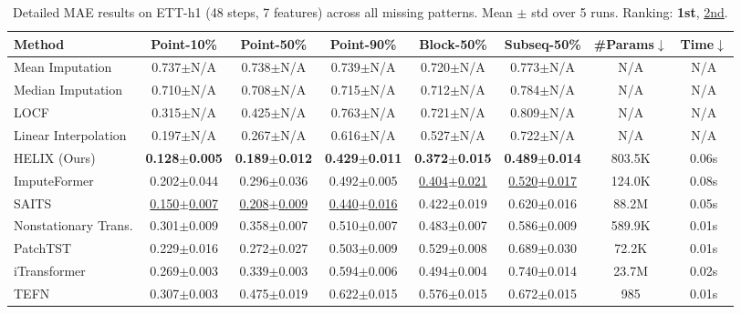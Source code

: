 \begin{table}[t]
    \caption{Detailed MAE results on ETT-h1 (48 steps, 7 features) across all missing patterns. Mean $\pm$ std over 5 runs. Ranking: \textbf{1st}, \underline{2nd}.}
    \label{tab:detailed_results}
    \centering
    \begin{small}
    \begin{tabular}{l|ccccc|cc}
        \toprule
        \textbf{Method} & \textbf{Point-10\%} & \textbf{Point-50\%} & \textbf{Point-90\%} & \textbf{Block-50\%} & \textbf{Subseq-50\%} & \textbf{\#Params}$\downarrow$ & \textbf{Time}$\downarrow$ \\
        \midrule
        Mean Imputation & 0.737$\pm$N/A & 0.738$\pm$N/A & 0.739$\pm$N/A & 0.720$\pm$N/A & 0.773$\pm$N/A & N/A & N/A \\
        Median Imputation & 0.710$\pm$N/A & 0.708$\pm$N/A & 0.715$\pm$N/A & 0.712$\pm$N/A & 0.784$\pm$N/A & N/A & N/A \\
        LOCF & 0.315$\pm$N/A & 0.425$\pm$N/A & 0.763$\pm$N/A & 0.721$\pm$N/A & 0.809$\pm$N/A & N/A & N/A \\
        Linear Interpolation & 0.197$\pm$N/A & 0.267$\pm$N/A & 0.616$\pm$N/A & 0.527$\pm$N/A & 0.722$\pm$N/A & N/A & N/A \\
        \midrule
        HELIX (Ours) & \textbf{0.128$\pm$0.005} & \textbf{0.189$\pm$0.012} & \textbf{0.429$\pm$0.011} & \textbf{0.372$\pm$0.015} & \textbf{0.489$\pm$0.014} & 803.5K & 0.06s \\
        ImputeFormer & 0.202$\pm$0.044 & 0.296$\pm$0.036 & 0.492$\pm$0.005 & \underline{0.404$\pm$0.021} & \underline{0.520$\pm$0.017} & 124.0K & 0.08s \\
        SAITS & \underline{0.150$\pm$0.007} & \underline{0.208$\pm$0.009} & \underline{0.440$\pm$0.016} & 0.422$\pm$0.019 & 0.620$\pm$0.016 & 88.2M & 0.05s \\
        Nonstationary Trans. & 0.301$\pm$0.009 & 0.358$\pm$0.007 & 0.510$\pm$0.007 & 0.483$\pm$0.007 & 0.586$\pm$0.009 & 589.9K & 0.01s \\
        PatchTST & 0.229$\pm$0.016 & 0.272$\pm$0.027 & 0.503$\pm$0.009 & 0.529$\pm$0.008 & 0.689$\pm$0.030 & 72.2K & 0.01s \\
        iTransformer & 0.269$\pm$0.003 & 0.339$\pm$0.003 & 0.594$\pm$0.006 & 0.494$\pm$0.004 & 0.740$\pm$0.014 & 23.7M & 0.02s \\
        TEFN & 0.307$\pm$0.003 & 0.475$\pm$0.019 & 0.622$\pm$0.015 & 0.576$\pm$0.015 & 0.672$\pm$0.015 & 985 & 0.01s \\

\end{tabular}
\end{small}
\end{table}
